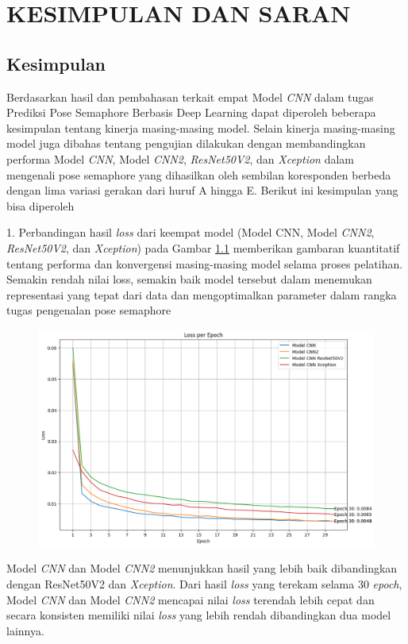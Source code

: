 
\chapter{KESIMPULAN DAN SARAN}

\section{Kesimpulan}
Berdasarkan hasil dan pembahasan terkait empat Model \textit{CNN} dalam tugas Prediksi Pose Semaphore Berbasis Deep Learning dapat diperoleh beberapa kesimpulan tentang kinerja masing-masing model. Selain kinerja masing-masing model juga dibahas tentang pengujian dilakukan dengan membandingkan performa Model \textit{CNN}, Model \textit{CNN2}, \textit{ResNet50V2}, dan \textit{Xception} dalam mengenali pose semaphore yang dihasilkan oleh sembilan koresponden berbeda dengan lima variasi gerakan dari huruf A hingga E. Berikut ini kesimpulan yang bisa diperoleh 

1. Perbandingan hasil \textit{loss} dari keempat model (Model CNN, Model \textit{CNN2}, \textit{ResNet50V2}, dan \textit{Xception}) pada Gambar \ref{fig:GrafikPerbandinganLoss} memberikan gambaran kuantitatif tentang performa dan konvergensi masing-masing model selama proses pelatihan. Semakin rendah nilai loss, semakin baik model tersebut dalam menemukan representasi yang tepat dari data dan mengoptimalkan parameter dalam rangka tugas pengenalan pose semaphore 
\begin{figure}[!hbt]
	\centering
	\includegraphics[width=0.7\linewidth]{gambar/bener/Perbandingan_LossCNN.png}
	\label{fig:GrafikPerbandinganLoss}
\end{figure}
Model \textit{CNN} dan Model \textit{CNN2} menunjukkan hasil yang lebih baik dibandingkan dengan ResNet50V2 dan \textit{Xception}. Dari hasil \textit{loss} yang terekam selama 30 \textit{epoch}, Model \textit{CNN} dan Model \textit{CNN2} mencapai nilai \textit{loss} terendah lebih cepat dan secara konsisten memiliki nilai \textit{loss} yang lebih rendah dibandingkan dua model lainnya.


